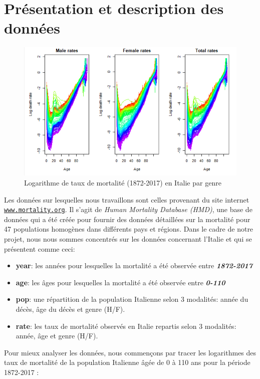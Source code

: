 \documentclass[french]{report}
\begin{document}
\section{Présentation et description des données}
\begin{figure}[ht]
    \centering
    \includegraphics[width=6.5in]{death_rate_par_rapport_age.png}
    \caption{Logarithme de taux de mortalité (1872-2017) en Italie par genre }
    \label{fig:log_death_rate_age}
\end{figure}
Les données sur lesquelles nous travaillons sont celles provenant du site internet \texttt{\href{https://www.mortality.org/}{www.mortality.org}}. Il s'agit de \textit{Human Mortality Database (HMD)}, une base de données qui a été créée pour fournir des données détaillées sur la mortalité pour 47 populations homogènes dans différents pays et régions.
\vskip 0.1in
Dans le cadre de notre projet, nous nous sommes concentrés sur les données concernant l'Italie et qui se présentent comme ceci:
\vskip 0.1in
\begin{itemize}
    \item \textbf{year}: les années pour lesquelles la mortalité a été observée entre \textbf{\textit{1872-2017}}
    \item \textbf{age}: les âges pour lesquelles la mortalité a été observée entre \textbf{\textit{0-110}}
    \item \textbf{pop}: une répartition de la population Italienne selon 3 modalités: année du décès, âge du décès et genre (H/F).
    \item \textbf{rate}: les taux de mortalité observés en Italie repartis selon 3 modalités: année, âge et genre (H/F).
\end{itemize}
\vskip 0.1in

Pour mieux analyser les données, nous commençons par tracer les logarithmes des taux de mortalité de la population Italienne âgée de 0 à 110 ans pour la période 1872-2017 :
\end{document}
